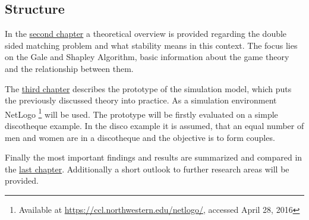 \subsection{Structure}
In the \hyperref[theory]{second chapter} a theoretical overview is provided regarding the double sided matching problem and what stability means in this context.
The focus lies on the Gale and Shapley Algorithm, basic information about the game theory and the relationship between them.

The \hyperref[prototype]{third chapter} describes the prototype of the simulation model, which puts the previously discussed theory into practice. 
As a simulation environment NetLogo \footnote{Available at \url{https://ccl.northwestern.edu/netlogo/}, accessed April 28, 2016} will be used.
The prototype will be firstly evaluated on a simple discotheque example.
In the disco example it is assumed, that an equal number of men and women are in a discotheque and the objective is to form couples.

Finally the most important findings and results are summarized and compared in the \hyperref[summary]{last chapter}.
Additionally a short outlook to further research areas will be provided.